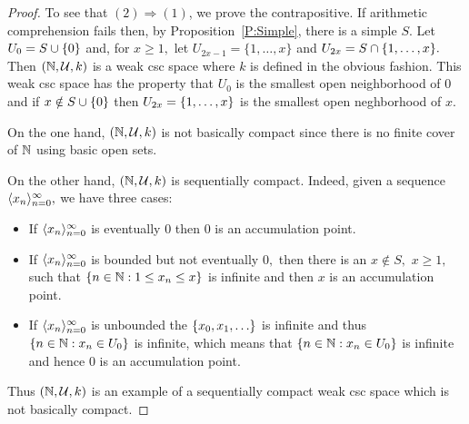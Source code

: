 \documentclass[csc]{subfiles}
\begin{document}
\begin{proof}
  To see that $(2)\Rightarrow(1)$, we prove the contrapositive.
  If arithmetic comprehension fails then, by Proposition~\ref{P:Simple}, there is a simple \eset{} \(S.\)
  Let \(U_0 = S \cup \lbrace0\rbrace\) and, for \(x \geq 1,\) let \(U_{2x-1} = \{1,\ldots,x\}\) and \(U_{2x} = S \cap \lbrace1,\ldots,x\rbrace.\)
  Then \((\mathbb{N},\mathcal{U},k)\) is a weak csc space where \(k\) is defined in the obvious fashion.
  This weak csc space has the property that \(U_0\) is the smallest open neighborhood of \(0\) and if \(x \notin S \cup \lbrace0\rbrace\) then \(U_{2x} = \lbrace1,\ldots,x\rbrace\) is the smallest open neghborhood of \(x.\)

  On the one hand, \((\mathbb{N},\mathcal{U},k)\) is not basically compact since there is no finite cover of \(\mathbb{N}\) using basic open sets.

  On the other hand, \((\mathbb{N},\mathcal{U},k)\) is sequentially compact.
  Indeed, given a sequence \(\langle x_n\rangle_{n=0}^\infty,\) we have three cases:
  \begin{itemize}
  \item If \(\langle x_n\rangle_{n=0}^\infty\) is eventually \(0\) then \(0\) is an accumulation point.
  \item If \(\langle x_n\rangle_{n=0}^\infty\) is bounded but not eventually \(0,\) then there is an \(x \notin S,\) \(x \geq 1,\) such that \(\lbrace n \in \mathbb{N} : 1 \leq x_n \leq x\rbrace\) is infinite and then \(x\) is an accumulation point.
  \item If \(\langle x_n\rangle_{n=0}^\infty\) is unbounded the \eset{} \(\lbrace x_0,x_1,\ldots\rbrace\) is infinite and thus \(\lbrace n \in \mathbb{N} : x_n \in U_0\rbrace\) is infinite, which means that \(\lbrace n \in \mathbb{N} : x_n \in U_0\rbrace\) is infinite and hence \(0\) is an accumulation point.
  \end{itemize}
  Thus \((\mathbb{N},\mathcal{U},k)\) is an example of a sequentially compact weak csc space which is not basically compact.
\end{proof}
\end{document}
